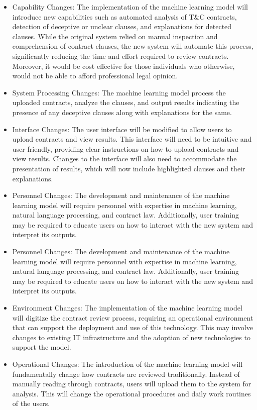 \begin{itemize}
    \item Capability Changes: The implementation of the machine learning model will introduce new capabilities such as automated analysis of T&C contracts, detection of deceptive or unclear clauses, and explanations for detected clauses. While the original system relied on manual inspection and comprehension of contract clauses, the new system will automate this process, significantly reducing the time and effort required to review contracts. Moreover, it would be cost effective for those individuals who otherwise, would not be able to afford professional legal opinion.
    \item System Processing Changes: The machine learning model process the uploaded contracts, analyze the clauses, and output results indicating the presence of any deceptive clauses along with explanations for the same. 
    \item  Interface Changes: The user interface will be modified to allow users to upload contracts and view results. This interface will need to be intuitive and user-friendly, providing clear instructions on how to upload contracts and view results. Changes to the interface will also need to accommodate the presentation of results, which will now include highlighted clauses and their explanations.
    \item Personnel Changes: The development and maintenance of the machine learning model will require personnel with expertise in machine learning, natural language processing, and contract law. Additionally, user training may be required to educate users on how to interact with the new system and interpret its outputs.
    \item Personnel Changes: The development and maintenance of the machine learning model will require personnel with expertise in machine learning, natural language processing, and contract law. Additionally, user training may be required to educate users on how to interact with the new system and interpret its outputs.
    \item Environment Changes: The implementation of the machine learning model will digitize the contract review process, requiring an operational environment that can support the deployment and use of this technology. This may involve changes to existing IT infrastructure and the adoption of new technologies to support the model.
    \item Operational Changes: The introduction of the machine learning model will fundamentally change how contracts are reviewed traditionally. Instead of manually reading through contracts, users will upload them to the system for analysis. This will change the operational procedures and daily work routines of the users.

\end{itemize}

